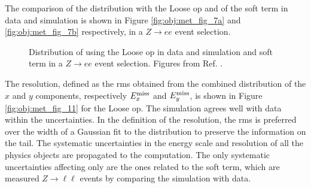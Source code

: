 The comparison of the \met distribution with the Loose \gls{op} and of the \met soft term in data and simulation is shown in Figure 
\ref{fig:obj:met_fig_7a} and \ref{fig:obj:met_fig_7b} respectively, in a $Z \rightarrow ee$ event selection.

\begin{figure}[htbp]
\begin{center}
\end{center}
 \caption{
 Distribution of   \met using the Loose \met \gls{op} in data and simulation 
 and  \met soft term  in a $Z \rightarrow ee$ event selection. 
Figures from Ref. \cite{ATLAS-CONF-2018-023}. 
 }
  \label{fig:obj:met_fig_7}
\end{figure}


The \met resolution, defined as the \gls{rms} obtained from the combined distribution of the 
$x$ and $y$ components, respectively $E_x^{\rm{miss}}$ and $E_y^{\rm{miss}}$, is shown in Figure \ref{fig:obj:met_fig_11} for 
the Loose \gls{op}. 
The simulation agrees well with data within the uncertainties.
In the definition of the resolution, the \gls{rms} is preferred over the width of a Gaussian fit to the distribution  
to preserve the information on the tail. 
The systematic uncertainties in the energy scale and resolution of all the physics objects are propagated to the \met computation.
The only systematic uncertainties affecting only \met are the ones related to the soft term, which are measured 
$Z \rightarrow \ell \ell$ events by comparing the simulation with data.



